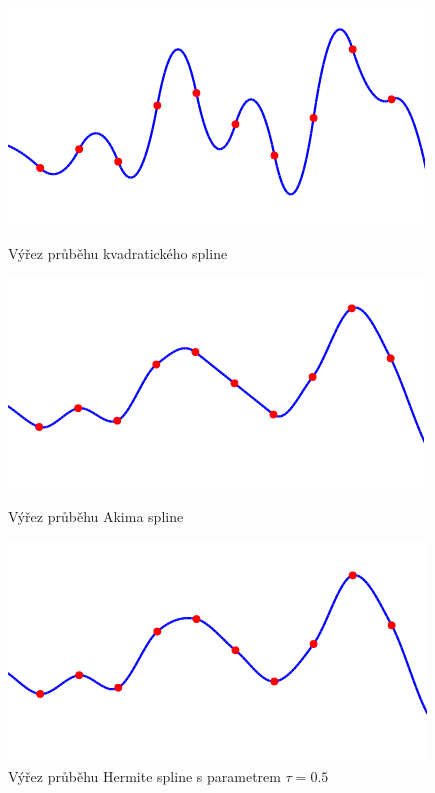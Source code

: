 \documentclass[]{thesiskiv}
\begin{document}
\begin{figure}
\centering
\captionsetup{width=1.0\textwidth}
\begin{minipage}[ht]{0.65\textwidth}
	\includegraphics[width=\linewidth]{img/sample-quad.png}
	\caption{Výřez průběhu kvadratického spline}\label{obr:quadfinal}
\end{minipage}

\begin{minipage}[ht]{0.65\textwidth}
	\includegraphics[width=\linewidth]{img/sample-akima.png}
	\caption{Výřez průběhu Akima spline}\label{obr:akimafinal}
\end{minipage}

\begin{minipage}[ht]{0.65\textwidth}
	\includegraphics[width=\linewidth]{img/sample-hermite.png}
	\caption{Výřez průběhu Hermite spline s parametrem $\tau = 0.5$}\label{obr:hermitefinal}
\end{minipage}


\end{figure}
\end{document}

